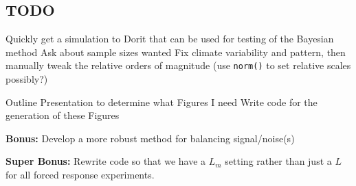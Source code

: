 \documentclass[11pt]{article}
\begin{document}
\subsection{TODO}
\begin{outline}[enumerate]
\1 Quickly get a simulation to Dorit that can be used for testing of the Bayesian method
\2 Ask about sample sizes wanted
\2 Fix climate variability and pattern, then manually tweak the relative orders of magnitude (use \texttt{norm()} to set relative scales possibly?)

\1 Outline Presentation to determine what Figures I need
\2 Write code for the generation of these Figures



\1 \textbf{Bonus:} Develop a more robust method for balancing signal/noise(s)


\1 \textbf{Super Bonus:} Rewrite code so that we have a $L_m$ setting rather than just a $L$ for all forced response experiments. 
\end{outline}
\end{document}
